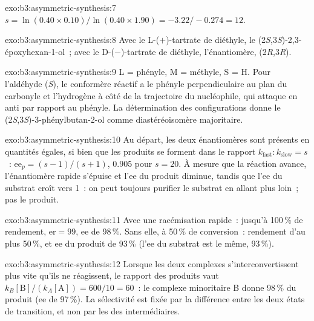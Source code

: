 \begin{solution}{exo:b3:asymmetric-synthesis:7}
$s = \ln(0.40 \times 0.10)/\ln(0.40 \times 1.90) = -3.22/-0.274 = 12$.
\end{solution}

\begin{solution}{exo:b3:asymmetric-synthesis:8}
Avec le L-($+$)-tartrate de diéthyle, le (2\textit{S},3\textit{S})-2,3-époxyhexan-1-ol~; avec le D-($-$)-tartrate de diéthyle,
l'énantiomère, (2\textit{R},3\textit{R}).
\end{solution}

\begin{solution}{exo:b3:asymmetric-synthesis:9}
L = phényle, M = méthyle, S = H. Pour l'aldéhyde (\textit{S}), le conformère réactif a le phényle
perpendiculaire au plan du carbonyle et l'hydrogène à côté de la
trajectoire du nucléophile, qui attaque en anti par rapport au phényle. La
détermination des configurations donne le
(2\textit{S},3\textit{S})-3-phénylbutan-2-ol comme diastéréoisomère majoritaire.
\end{solution}

\begin{solution}{exo:b3:asymmetric-synthesis:10}
Au départ, les deux énantiomères sont présents en quantités égales, si bien que les produits
se forment dans le rapport $k_{\mathrm{fast}} : k_{\mathrm{slow}} = s$~: $\mathrm{ee}_p = (s - 1)/(s + 1)$, 0.905 pour $s = 20$. À mesure que la réaction avance,
l'énantiomère rapide s'épuise et l'ee du produit diminue, tandis que l'ee
du substrat croît vers 1~: on peut toujours purifier le substrat en
allant plus loin~; pas le produit.
\end{solution}

\begin{solution}{exo:b3:asymmetric-synthesis:11}
Avec une racémisation rapide~: jusqu'à 100\,\% de rendement, $\mathrm{er} = 99$, ee de 98\,\%. Sans elle, à 50\,\% de
conversion~: rendement d'au plus 50\,\%, et ee du produit de 93\,\% (l'ee
du substrat est le même, 93\,\%).
\end{solution}

\begin{solution}{exo:b3:asymmetric-synthesis:12}
Lorsque les deux complexes s'interconvertissent plus vite qu'ils ne
réagissent, le rapport des produits vaut
$k_B[\mathrm B]/(k_A[\mathrm A]) = 600/10 = 60$~: le complexe minoritaire B donne 98\,\% du produit (ee de 97\,\%). La
sélectivité est fixée par la différence entre les deux états de
transition, et non par les  des intermédiaires.
\end{solution}

